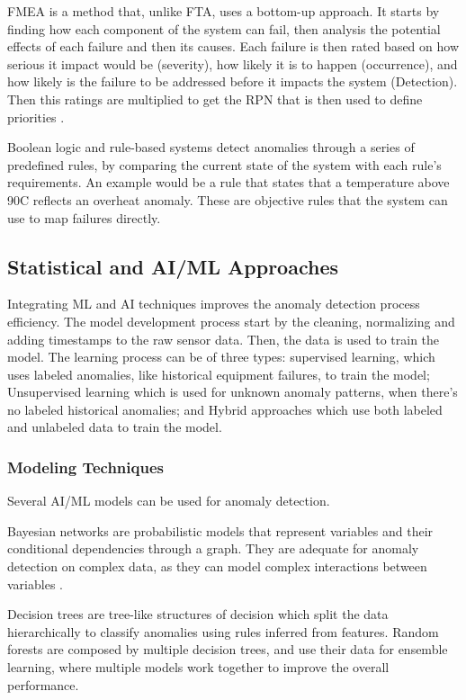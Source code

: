 \gls{FMEA} is a method that, unlike \gls{FTA}, uses a bottom-up approach.
It starts by finding how each component of the system can fail, then analysis
the potential effects of each failure and then its causes. Each failure is
then rated based on how serious it impact would be (severity), how likely it is
to happen (occurrence), and how likely is the failure to be addressed before
it impacts the system (Detection). Then this ratings are multiplied to get
the \gls{RPN} that is then used to define priorities \cite{CambridgeFMEA}.

Boolean logic and rule-based systems detect anomalies through a series of
predefined rules, by comparing the current state of the system with each
rule's requirements. An example would be a rule that states that a temperature
above 90\textdegree C reflects an overheat anomaly. These are objective rules
that the system can use to map failures directly.


\subsection{Statistical and AI/ML Approaches}
Integrating \gls{ML} and \gls{AI} techniques improves the anomaly detection
process efficiency.
The model development process start by the cleaning, normalizing and adding
timestamps to the raw sensor data. Then, the data is used to train the model.
The learning process can be of three types: supervised learning, which uses
labeled anomalies, like historical equipment failures, to train the model;
Unsupervised learning which is used for unknown anomaly patterns, when there's
no labeled historical anomalies; and Hybrid approaches which use both labeled
and unlabeled data to train the model.

\subsubsection{Modeling Techniques}
Several \gls{AI}/\gls{ML} models can be used for anomaly detection.

Bayesian networks are probabilistic models that represent variables and their
conditional dependencies through a graph. They are adequate for anomaly
detection on complex data, as they can model complex interactions between
variables \cite{BayesServerIntro, BayesServerAnomaly}.

Decision trees are tree-like structures of decision which split the data
hierarchically to classify anomalies using rules inferred from features.
Random forests are composed by multiple decision trees, and use their data
for ensemble learning, where multiple models work together to improve the
overall performance. \cite{Zhang2022}


